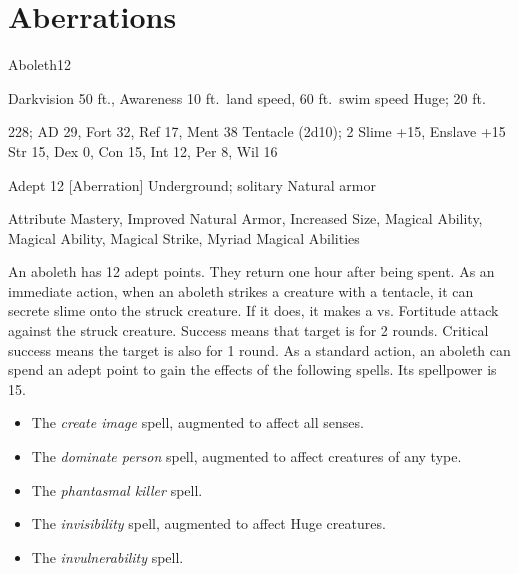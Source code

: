 \section{Aberrations}

    \begin{monsection}{Aboleth}{12}
        \begin{spellcontent}
            \begin{spelltargetinginfo}
                \pari {} Darkvision 50 ft., Awareness 
                \pari {} 10 ft.\ land speed, 60 ft.\ swim speed
                \pari {} Huge;  20 ft.
            \end{spelltargetinginfo}
            \begin{spelleffects}
                \pari {} 228;  AD 29, Fort 32, Ref 17, Ment 38
                \pari {} Tentacle  (2d10);  2
                \pari {} Slime +15, Enslave +15
                \pari {} Str 15, Dex 0, Con 15, Int 12, Per 8, Wil 16
            \end{spelleffects}
        \end{spellcontent}
        \begin{spellfooter}
            \pari {} Adept 12 [Aberration]
            \pari {} Underground; solitary
            \pari {} Natural armor 
        \end{spellfooter}
    \end{monsection}
     Attribute Mastery, Improved Natural Armor, Increased Size, Magical Ability, Magical Ability, Magical Strike, Myriad Magical Abilities

     An aboleth has 12 adept points.
    They return one hour after being spent.
     As an immediate action, when an aboleth strikes a creature with a tentacle, it can secrete slime onto the struck creature.
    If it does, it makes a  vs. Fortitude attack against the struck creature.
    Success means that target is \sickened for 2 rounds.
    Critical success means the target is also \nauseated for 1 round.
     As a standard action, an aboleth can spend an adept point to gain the effects of the following spells.
    Its spellpower is 15.
    \begin{itemize}
        \item The \textit{create image} spell, augmented to affect all senses.
        \item The \textit{dominate person} spell, augmented to affect creatures of any type.
        \item The \textit{phantasmal killer} spell.
        \item The \textit{invisibility} spell, augmented to affect Huge creatures.
        \item The \textit{invulnerability} spell.
    \end{itemize}
